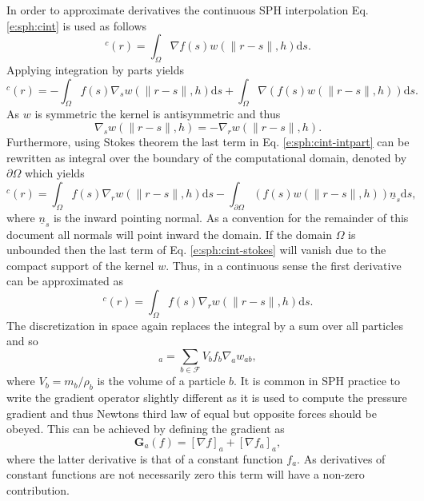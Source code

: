 \documentclass[12pt]{memoir}
\newcommand{\uvec}[1]{\underline{#1}}
\newcommand{\td}{\text{d}}
\newcommand{\sumF}{\underset{b \in \mathcal{F}}{\sum}}
\newcommand{\Grad}{\textbf{G}}
\begin{document}
In order to approximate derivatives the continuous SPH interpolation Eq.
\eqref{e:sph:cint} is used as follows
\begin{equation}
[\nabla f]^c(r) = \int_\Omega \nabla f(s) w(\|r-s\|,h) \td s.
\label{e:sph:cint-gradf-start}
\end{equation}
Applying integration by parts yields
\begin{equation}
[\nabla f]^c(r) = - \int_\Omega f(s) \nabla_s w(\|r-s\|,h) \td s +
\int_\Omega \nabla (f(s) w(\|r-s\|,h)) \td s.
\label{e:sph:cint-intpart}
\end{equation}
As $w$ is symmetric the kernel is antisymmetric and thus
\begin{equation}
\nabla_s w(\|r-s\|,h) = - \nabla_r w(\|r-s\|,h).
\label{e:sph:kernel-asym} \end{equation}
Furthermore, using Stokes
theorem the last term in Eq. \eqref{e:sph:cint-intpart} can be rewritten
as integral over the boundary of the computational domain, denoted by
$\partial \Omega$ which yields
\begin{equation}
[\nabla f]^c(r) = \int_\Omega f(s) \nabla_r w(\|r-s\|,h) \td s -
\int_{\partial\Omega} (f(s) w(\|r-s\|,h)) \uvec{n}_s \td s,
\label{e:sph:cint-stokes}
\end{equation}
where $\uvec{n}_s$ is the inward pointing normal. As a convention for
the remainder of this document all normals will point inward the domain.
If the domain $\Omega$ is unbounded then the last term of Eq.
\eqref{e:sph:cint-stokes} will vanish due to the compact support of the
kernel $w$. Thus, in a continuous sense the first derivative can be
approximated as
\begin{equation}
[\nabla f]^c(r) = \int_\Omega f(s) \nabla_r w(\|r-s\|,h) \td s.
\label{e:sph:cint-gradf}
\end{equation}
The discretization in space again replaces the integral by a sum over
all particles and so
\begin{equation}
[\nabla f]_a = \sumF V_b f_b \nabla_a w_{ab},
\label{e:sph:int-gradf}
\end{equation}
where $V_b = m_b/\rho_b$ is the volume of a particle $b$. It is common
in SPH practice to write the gradient operator slightly different as it
is used to compute the pressure gradient and thus Newtons third law of
equal but opposite forces should be obeyed. This can be achieved by
defining the gradient as
\begin{equation}
\Grad_a(f) = [\nabla f]_a + [\nabla f_a]_a,
\label{e:sph:grad-def}
\end{equation}
where the latter derivative is that of a constant function $f_a$. As
derivatives of constant functions are not necessarily zero this term
will have a non-zero contribution.
\end{document}
